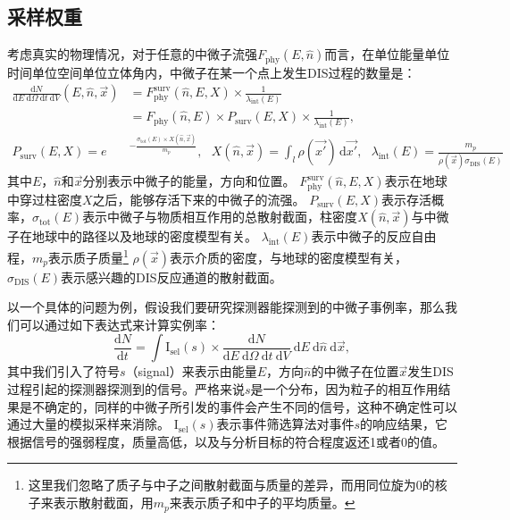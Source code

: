\subsection{采样权重}
\label{subsec:weightings}

考虑真实的物理情况，对于任意的中微子流强$F_\mathrm{phy}(E, \hat{n})$而言，在单位能量单位时间单位空间单位立体角内，中微子在某一个点上发生DIS过程的数量是：
\begin{equation}
\begin{aligned}
    \frac{\mathrm{d}N}{\mathrm{d}E ~\mathrm{d}\Omega ~\mathrm{d}t ~\mathrm{d}V} (E, \hat{n}, \vec{x})
    &= F_\mathrm{phy}^\mathrm{surv} (\hat{n}, E, X)\times \frac{1}{\lambda_\mathrm{int}(E)} \\
    &= F_\mathrm{phy}(\hat{n}, E) \times P_\mathrm{surv}(E, X) \times \frac{1}{\lambda_\mathrm{int}(E)} , \\
    P_\mathrm{surv}(E, X) = e&^{- \frac{\sigma_\mathrm{tot}(E) \times X(\hat{n}, \vec{x})}{m_{p}}}, ~~~
    X(\hat{n}, \vec{x}) = \int_l \rho(\vec{x'}) \,\mathrm{d}\vec{x'}, ~~~
    \lambda_\mathrm{int}(E) = \frac{m_{p}}{\rho(\vec{x}) \sigma_\mathrm{DIS}(E)}
\end{aligned}
\label{eq:sampling_phy_pdf}
\end{equation}
其中$E$，$\hat{n}$和$\vec{x}$分别表示中微子的能量，方向和位置。
$F_\mathrm{phy}^\mathrm{surv} (\hat{n}, E, X)$表示在地球中穿过柱密度$X$之后，能够存活下来的中微子的流强。
$P_\mathrm{surv}(E, X)$表示存活概率，$\sigma_\mathrm{tot}(E)$表示中微子与物质相互作用的总散射截面，柱密度$X(\hat{n}, \vec{x})$与中微子在地球中的路径以及地球的密度模型有关。
$\lambda_\mathrm{int}(E)$表示中微子的反应自由程，$m_p$表示质子质量\footnote{这里我们忽略了质子与中子之间散射截面与质量的差异，而用同位旋为0的核子来表示散射截面，用$m_p$来表示质子和中子的平均质量。}
$\rho(\vec{x})$表示介质的密度，与地球的密度模型有关，$\sigma_\mathrm{DIS}(E)$表示感兴趣的DIS反应通道的散射截面。

以一个具体的问题为例，假设我们要研究探测器能探测到的中微子事例率，那么我们可以通过如下表达式来计算实例率：
\begin{equation}
    \frac{\mathrm{d}N}{\mathrm{d}t} = 
    \int \mathrm{I}_\mathrm{sel}(s) \times \frac{\mathrm{d}N}{\mathrm{d}E ~\mathrm{d}\Omega ~\mathrm{d}t ~\mathrm{d}V} 
    ~\mathrm{d}E ~\mathrm{d}\hat{n} ~\mathrm{d}\vec{x} ,
    \label{eq:sampling_phy_trigger}
\end{equation}
其中我们引入了符号$s$（signal）来表示由能量$E$，方向$\hat{n}$的中微子在位置$\vec{x}$发生DIS过程引起的探测器探测到的信号。严格来说$s$是一个分布，因为粒子的相互作用结果是不确定的，同样的中微子所引发的事件会产生不同的信号，这种不确定性可以通过大量的模拟采样来消除。
$\mathrm{I}_\mathrm{sel}(s)$表示事件筛选算法对事件$s$的响应结果，它根据信号的强弱程度，质量高低，以及与分析目标的符合程度返还1或者0的值。

